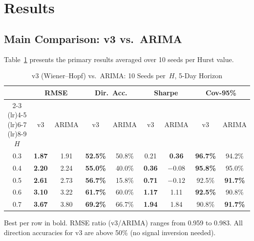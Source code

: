 \documentclass[12pt,a4paper]{article}
\begin{document}
\section{Results}
\label{sec:results}

\subsection{Main Comparison: v3 vs.\ ARIMA}

Table~\ref{tab:main_results} presents the primary results averaged over
10 seeds per Hurst value.

\begin{table}[htbp]
  \centering
  \caption{v3 (Wiener--Hopf) vs.\ ARIMA: 10 Seeds per~$H$, 5-Day Horizon}
  \label{tab:main_results}
  \begin{threeparttable}
  \begin{tabular}{c cc cc cc cc}
    \toprule
    & \multicolumn{2}{c}{\textbf{RMSE}} &
      \multicolumn{2}{c}{\textbf{Dir.\ Acc.}} &
      \multicolumn{2}{c}{\textbf{Sharpe}} &
      \multicolumn{2}{c}{\textbf{Cov-95\%}} \\
    \cmidrule(lr){2-3} \cmidrule(lr){4-5} \cmidrule(lr){6-7} \cmidrule(lr){8-9}
    $H$ & v3 & ARIMA & v3 & ARIMA & v3 & ARIMA & v3 & ARIMA \\
    \midrule
    0.3 & \textbf{1.87} & 1.91 & \textbf{52.5\%} & 50.8\% &
          0.21 & \textbf{0.36} & \textbf{96.7\%} & 94.2\% \\
    0.4 & \textbf{2.20} & 2.24 & \textbf{55.0\%} & 40.0\% &
          \textbf{0.36} & $-0.08$ & \textbf{95.8\%} & 95.0\% \\
    0.5 & \textbf{2.61} & 2.73 & \textbf{56.7\%} & 15.8\% &
          \textbf{0.71} & $-0.12$ & 92.5\% & \textbf{91.7\%} \\
    0.6 & \textbf{3.10} & 3.22 & \textbf{61.7\%} & 60.0\% &
          \textbf{1.17} & 1.11 & \textbf{92.5\%} & 90.8\% \\
    0.7 & \textbf{3.67} & 3.80 & \textbf{69.2\%} & 66.7\% &
          \textbf{1.94} & 1.84 & 90.8\% & \textbf{91.7\%} \\
    \bottomrule
  \end{tabular}
  \begin{tablenotes}\small
    \item Best per row in bold.  RMSE ratio (v3/ARIMA) ranges from 0.959 to
          0.983.  All direction accuracies for v3 are above 50\% (no signal
          inversion needed).
  \end{tablenotes}
  \end{threeparttable}
\end{table}
\end{document}
